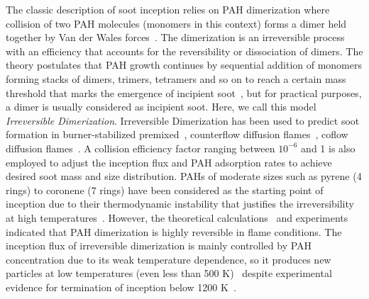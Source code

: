 
The classic description of soot inception relies on PAH dimerization where collision of two PAH molecules (monomers in this context) forms a dimer held together by Van der Wales forces~\citep{frenklach1991detailed}. The dimerization is an irreversible process with an efficiency that accounts for the reversibility or dissociation of dimers. The theory postulates that PAH growth continues by sequential addition of monomers forming stacks of dimers, trimers, tetramers and so on to reach a certain mass threshold that marks the emergence of incipient soot~\citep{frenklach1991detailed}, but for practical purposes, a dimer is usually considered as incipient soot. Here, we call this model \textit{Irreversible Dimerization}. 
Irreversible Dimerization has been used to predict soot formation in burner-stabilized premixed~\citep{salenbauch2015modeling, desgroux2017comparative}, counterflow diffusion flames~\citep{wang2015soot, xu2021experimental}, coflow diffusion flames~\citep{kholghy2016core, veshkini2016understanding}. A collision efficiency factor ranging between $10^{-6}$ and 1 is also employed to adjust the inception flux and PAH adsorption rates to achieve desired soot mass and size distribution. PAHs of moderate sizes such as pyrene (4 rings) to coronene (7 rings) have been considered as the starting point of inception due to their thermodynamic instability that justifies the irreversibility at high temperatures~\citep{frenklach1991detailed}. However, the theoretical calculations~\citep{miller1985calculations} and experiments~\citep{sabbah2010exploring} indicated that PAH dimerization is highly reversible in flame conditions. The inception flux of irreversible dimerization is mainly controlled by PAH concentration due to its weak temperature dependence, so it produces new particles at low temperatures (even less than 500 K)~\citep{naseri2022simulating} despite experimental evidence for termination of inception below 1200 K~\citep{sanchez2012polycyclic, cho2016synthesis}. 

